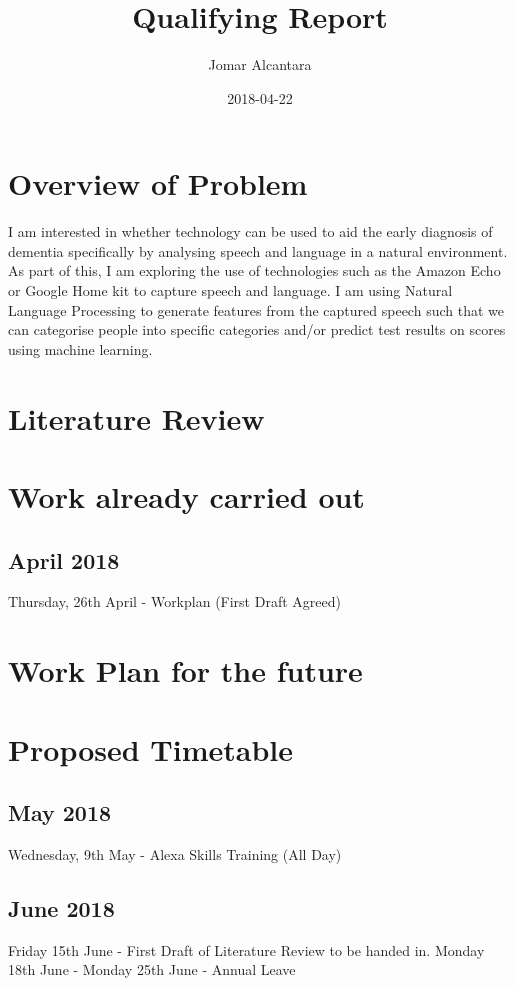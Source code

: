 \documentclass{article}
\title{Qualifying Report}
\date{2018-04-22}
\author{Jomar Alcantara}
\begin{document}
	\maketitle
	\newpage
	\section{Overview of Problem}
	I am interested in whether technology can be used to aid the early diagnosis of dementia specifically by analysing speech and language in a natural environment. As part of this, I am exploring the use of technologies such as the Amazon Echo or Google Home kit to capture speech and language. I am using Natural Language Processing to generate features from the captured speech such that we can categorise people into specific categories and/or predict test results on scores using machine learning.
	
	\section{Literature Review}
	
	\section{Work already carried out}
	
	\subsection{April 2018}
	
	Thursday, 26th April - Workplan (First Draft Agreed)

	
	\section{Work Plan for the future}
	
	
	\section{Proposed Timetable}
	
	\subsection{May 2018}
	Wednesday, 9th May - Alexa Skills Training (All Day)
	\subsection{June 2018}
	Friday 15th June - First Draft of Literature Review to be handed in.
	\newline
	Monday 18th June - Monday 25th June - Annual Leave
\end{document}

